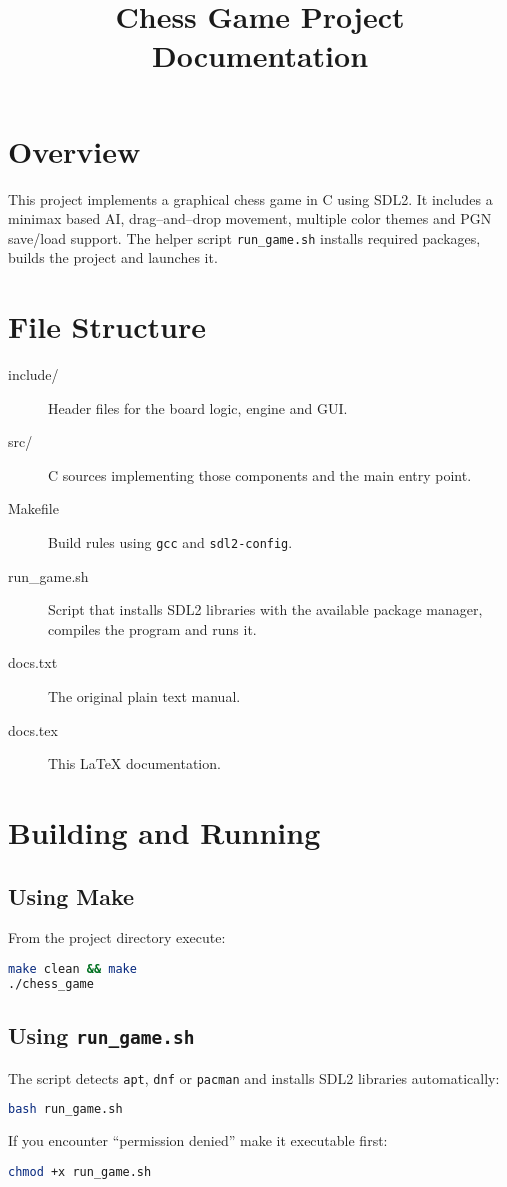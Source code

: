 \documentclass{article}
\title{Chess Game Project Documentation}
\date{}
\begin{document}
\maketitle

\section{Overview}
This project implements a graphical chess game in C using SDL2. It
includes a minimax based AI, drag--and--drop movement, multiple color
themes and PGN save/load support. The helper script
\texttt{run\_game.sh} installs required packages, builds the project and
launches it.

\section{File Structure}
\begin{description}
  \item[include/] Header files for the board logic, engine and GUI.
  \item[src/] C sources implementing those components and the main entry
  point.
  \item[Makefile] Build rules using \texttt{gcc} and \texttt{sdl2-config}.
  \item[run\_game.sh] Script that installs SDL2 libraries with the
  available package manager, compiles the program and runs it.
  \item[docs.txt] The original plain text manual.
  \item[docs.tex] This LaTeX documentation.
\end{description}

\section{Building and Running}
\subsection{Using Make}
From the project directory execute:
\begin{lstlisting}[language=bash]
make clean && make
./chess_game
\end{lstlisting}

\subsection{Using \texttt{run\_game.sh}}
The script detects \texttt{apt}, \texttt{dnf} or \texttt{pacman} and
installs SDL2 libraries automatically:
\begin{lstlisting}[language=bash]
bash run_game.sh
\end{lstlisting}
If you encounter ``permission denied'' make it executable first:
\begin{lstlisting}[language=bash]
chmod +x run_game.sh
\end{lstlisting}
\end{document}
